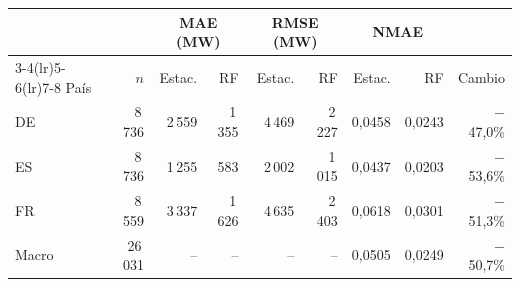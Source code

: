 \begin{tabular}{lrrrrrrrr}
\toprule
 & & \multicolumn{2}{c}{MAE (MW)} & \multicolumn{2}{c}{RMSE (MW)} & \multicolumn{2}{c}{NMAE} & \\
\cmidrule(lr){3-4}\cmidrule(lr){5-6}\cmidrule(lr){7-8}
País & $n$ & Estac. & RF & Estac. & RF & Estac. & RF & Cambio \\
\midrule
DE & 8\,736 & 2\,559 & 1\,355 & 4\,469 & 2\,227 & 0{,}0458 & 0{,}0243 & $-$47{,}0\% \\
ES & 8\,736 & 1\,255 & 583 & 2\,002 & 1\,015 & 0{,}0437 & 0{,}0203 & $-$53{,}6\% \\
FR & 8\,559 & 3\,337 & 1\,626 & 4\,635 & 2\,403 & 0{,}0618 & 0{,}0301 & $-$51{,}3\% \\
\midrule
Macro & 26\,031 & -- & -- & -- & -- & 0{,}0505 & 0{,}0249 & $-$50{,}7\% \\
\bottomrule
\end{tabular}